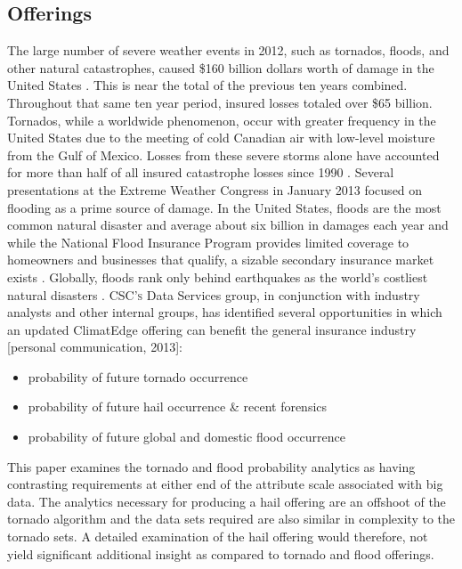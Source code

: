 \subsection{Offerings}
The large number of severe weather events in 2012, such as tornados, floods, and other natural catastrophes, caused \$160 billion dollars worth of damage in the United States \cite{stalder}. This is near the total of the previous ten years combined. Throughout that same ten year period, insured losses totaled over \$65 billion. Tornados, while a worldwide phenomenon, occur with greater frequency in the United States due to the meeting of cold Canadian air with low-level moisture from the Gulf of Mexico. Losses from these severe storms alone have accounted for more than half of all insured catastrophe losses since 1990 \cite{lloyds}. Several presentations at the Extreme Weather Congress in January 2013 focused on flooding as a prime source of damage. In the United States, floods are the most common natural disaster and average about six billion in damages each year and while the National Flood Insurance Program provides limited coverage to homeowners and businesses that qualify, a sizable secondary insurance market exists \cite{hope}. Globally, floods rank only behind earthquakes as the world's costliest natural disasters \cite{li}. \textsc{CSC's} Data Services group, in conjunction with industry analysts and other internal groups, has identified several opportunities in which an updated ClimatEdge offering can benefit the general insurance industry [personal communication, 2013]:
\begin{itemize}
    \item probability of future tornado occurrence
    \item probability of future hail occurrence \& recent forensics
    \item probability of future global and domestic flood occurrence
\end{itemize}
This paper examines the tornado and flood probability analytics as having contrasting requirements at either end of the attribute scale associated with big data. The analytics necessary for producing a hail offering are an offshoot of the tornado algorithm and the data sets required are also similar in complexity to the tornado sets. A detailed examination of the hail offering would therefore, not yield significant additional insight as compared to tornado and flood offerings.